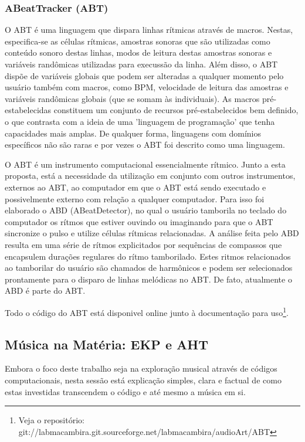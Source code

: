 \subsubsection{ABeatTracker (ABT)}

O ABT é uma linguagem que dispara linhas rítmicas através
de macros. Nestas, especifica-se as células rítmicas, amostras sonoras que
são utilizadas como conteúdo sonoro destas linhas, modos de leitura
destas amostras sonoras e variáveis randômicas utilizadas para
execussão da linha. Além disso, o ABT dispõe de variáveis globais que
podem ser alteradas a qualquer momento pelo usuário também com macros, como BPM,
velocidade de leitura das amostras e variáveis randômicas globais (que
se somam às individuais).
As macros
pré-estabelecidas constituem um conjunto de recursos pré-estabelecidos
bem definido, o que contrasta com a ideia de uma 'linguagem de
programação' que tenha capacidades mais amplas. De qualquer forma,
linguagens com domínios específicos não são raras e por vezes o ABT
foi descrito como uma linguagem.

O ABT é um instrumento computacional essencialmente rítmico. Junto a esta
proposta, está a necessidade da utilização em conjunto com outros
instrumentos, externos ao ABT, ao computador em que o ABT está sendo executado
e possivelmente externo com relação a qualquer computador. Para isso
foi elaborado o ABD (ABeatDetector), no qual o usuário tamborila no
teclado do computador os rítmos que estiver ouvindo ou imaginando para
que o ABT sincronize o pulso e utilize células rítmicas
relacionadas. A análise feita pelo ABD resulta em uma série de rítmos
explicitados por sequências de compassos que encapsulem durações
regulares do rítmo tamborilado. Estes ritmos relacionados ao
tamborilar do usuário são chamados de harmônicos e podem ser
selecionados prontamente para o disparo de linhas melódicas no ABT.
De fato, atualmente o ABD é parte do ABT.

Todo o código do
ABT está disponivel online junto à documentação para uso\footnote{Veja o
repositório: git://labmacambira.git.sourceforge.net/labmacambira/audioArt/ABT}.


\subsection{Música na Matéria: EKP e AHT}
\label{aht}

Embora o foco deste trabalho seja na exploração musical através de
códigos computacionais, nesta sessão está explicação simples,
clara e factual de como estas investidas transcendem o código e até
mesmo a música em si.

